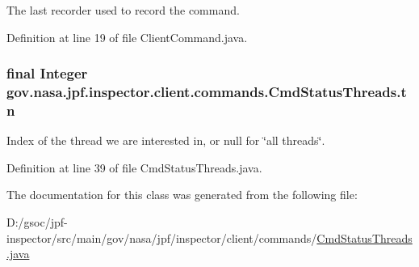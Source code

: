 The last recorder used to record the command. 



Definition at line 19 of file Client\+Command.\+java.

\subsubsection[{\texorpdfstring{tn}{tn}}]{\setlength{\rightskip}{0pt plus 5cm}final Integer gov.\+nasa.\+jpf.\+inspector.\+client.\+commands.\+Cmd\+Status\+Threads.\+tn\hspace{0.3cm}{\ttfamily [private]}}\hypertarget{classgov_1_1nasa_1_1jpf_1_1inspector_1_1client_1_1commands_1_1_cmd_status_threads_afa72fece4b1cb85e254c99e42a8e553f}{}\label{classgov_1_1nasa_1_1jpf_1_1inspector_1_1client_1_1commands_1_1_cmd_status_threads_afa72fece4b1cb85e254c99e42a8e553f}


Index of the thread we are interested in, or null for \char`\"{}all threads\char`\"{}. 



Definition at line 39 of file Cmd\+Status\+Threads.\+java.



The documentation for this class was generated from the following file\+:\begin{DoxyCompactItemize}
\item 
D\+:/gsoc/jpf-\/inspector/src/main/gov/nasa/jpf/inspector/client/commands/\hyperlink{_cmd_status_threads_8java}{Cmd\+Status\+Threads.\+java}\end{DoxyCompactItemize}
